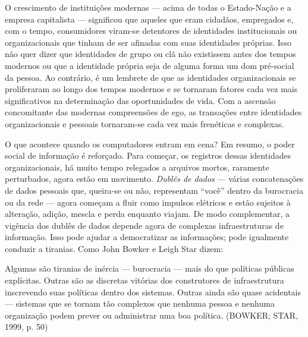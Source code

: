 O crescimento de instituições modernas --- acima de todas o Estado-Nação
e a empresa capitalista --- significou que aqueles que eram cidadãos,
empregados e, com o tempo, consumidores viram-se detentores de
identidades institucionais ou organizacionais que tinham de ser afinadas
com suas identidades próprias. Isso não quer dizer que identidades de
grupo ou clã não existissem antes dos tempos modernos ou que a
identidade própria seja de alguma forma um dom pré-social da pessoa. Ao
contrário, é um lembrete de que as identidades organizacionais se
proliferaram ao longo dos tempos modernos e se tornaram fatores cada vez
mais significativos na determinação das oportunidades de vida. Com a
ascensão concomitante das modernas compreensões de ego, as transações
entre identidades organizacionais e pessoais tornaram-se cada vez mais
frenéticas e complexas.

O que acontece quando os computadores entram em cena? Em resumo, o poder
social de informação é reforçado. Para começar, os registros dessas
identidades organizacionais, há muito tempo relegados a arquivos mortos,
raramente perturbados, agora estão em movimento. \emph{Dublês de dados}
--- várias concatenações de dados pessoais que, queira-se ou não,
representam ``você'' dentro da burocracia ou da rede --- agora começam a
fluir como impulsos elétricos e estão sujeitos à alteração, adição,
mescla e perda enquanto viajam. De modo complementar, a vigência dos
dublês de dados depende agora de complexas infraestruturas de
informação. Isso pode ajudar a democratizar as informações; pode
igualmente conduzir a tiranias. Como John Bowker e Leigh Star dizem:

Algumas são tiranias de inércia --- burocracia --- mais do que políticas
públicas explícitas. Outras são as discretas vitórias dos construtores
de infraestrutura inscrevendo suas políticas dentro dos sistemas. Outras
ainda são quase acidentais --- sistemas que se tornam tão complexos que
nenhuma pessoa e nenhuma organização podem prever ou administrar uma boa
política. (BOWKER; STAR, 1999, p. 50)


